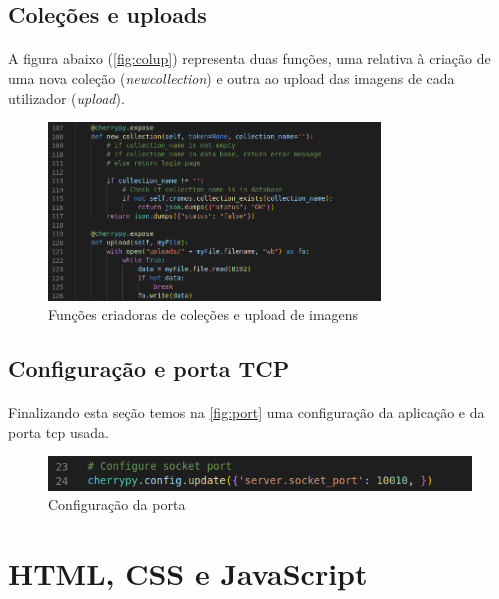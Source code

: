 \documentclass[a4paper, 11pt, oneside]{report}
\begin{document}
\subsection{Coleções e uploads}

\paragraph{} A figura abaixo (\autoref{fig:colup}) representa duas funções, uma relativa à criação de uma nova coleção (\textit{new\textunderscore collection}) e outra ao upload das imagens de cada utilizador (\textit{upload}).

\begin{figure}[h]
\center
\includegraphics[width=250pt]{colupIMAGE.png}
\caption{Funções criadoras de coleções e upload de imagens}
\label{fig:colup}
\end{figure}

\subsection{Configuração e porta TCP}

\paragraph{} Finalizando esta seção temos na \autoref{fig:port} uma configuração da aplicação e da porta \ac{tcp} usada.

\begin{figure}[h]
\center
\includegraphics[width=320pt]{configPORT.png}
\caption{Configuração da porta}
\label{fig:port}
\end{figure}

\section{HTML, CSS e JavaScript}
\end{document}
